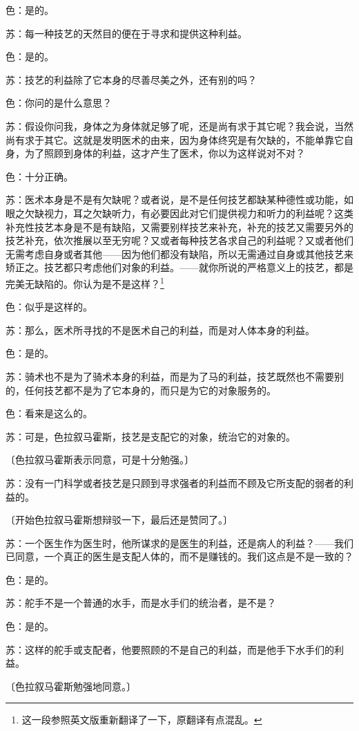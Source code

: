 \documentclass[11pt,oneside]{book}
\begin{document}
\begin{common-format}
色：是的。

苏：每一种技艺的天然目的便在于寻求和提供这种利益。

色：是的。

苏：技艺的利益除了它本身的尽善尽美之外，还有别的吗？

色：你问的是什么意思？

苏：假设你问我，身体之为身体就足够了呢，还是尚有求于其它呢？我会说，当然尚有求于其它。这就是发明医术的由来，因为身体终究是有欠缺的，不能单靠它自身，为了照顾到身体的利益，这才产生了医术，你以为这样说对不对？

色：十分正确。

苏：医术本身是不是有欠缺呢？或者说，是不是任何技艺都缺某种德性或功能，如眼之欠缺视力，耳之欠缺听力，有必要因此对它们提供视力和听力的利益呢？这类补充性技艺本身是不是有缺陷，又需要别样技艺来补充，补充的技艺又需要另外的技艺补充，依次推展以至无穷呢？又或者每种技艺各求自己的利益呢？又或者他们无需考虑自身或者其他——因为他们都没有缺陷，所以无需通过自身或其他技艺来矫正之。技艺都只考虑他们对象的利益。——就你所说的严格意义上的技艺，都是完美无缺陷的。你认为是不是这样？\footnote{这一段参照英文版重新翻译了一下，原翻译有点混乱。}

色：似乎是这样的。

苏：那么，医术所寻找的不是医术自己的利益，而是对人体本身的利益。

色：是的。

苏：骑术也不是为了骑术本身的利益，而是为了马的利益，技艺既然也不需要别的，任何技艺都不是为了它本身的，而只是为它的对象服务的。

色：看来是这么的。

苏：可是，色拉叙马霍斯，技艺是支配它的对象，统治它的对象的。

〔色拉叙马霍斯表示同意，可是十分勉强。〕

苏：没有一门科学或者技艺是只顾到寻求强者的利益而不顾及它所支配的弱者的利益的。

〔开始色拉叙马霍斯想辩驳一下，最后还是赞同了。〕

苏：一个医生作为医生时，他所谋求的是医生的利益，还是病人的利益？——我们已同意，一个真正的医生是支配人体的，而不是赚钱的。我们这点是不是一致的？

色：是的。

苏：舵手不是一个普通的水手，而是水手们的统治者，是不是？

色：是的。

苏：这样的舵手或支配者，他要照顾的不是自己的利益，而是他手下水手们的利益。

〔色拉叙马霍斯勉强地同意。〕


\end{common-format}
\end{document}
